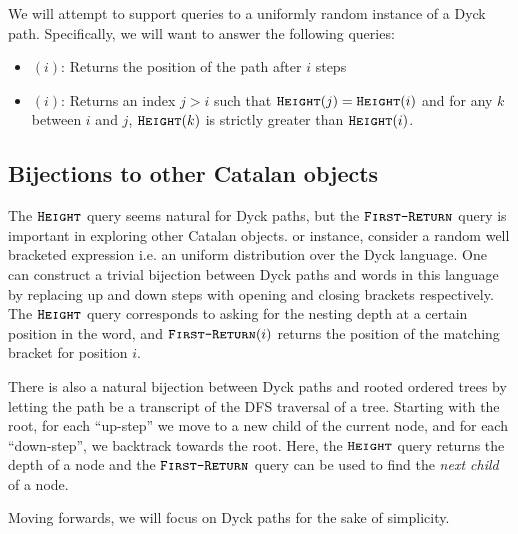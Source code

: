 We will attempt to support queries to a uniformly random instance of a Dyck path.
Specifically, we will want to answer the following queries:
\begin{itemize}
    \item {}$(i)$: Returns the position of the path after $i$ steps
    \item {}$(i)$: Returns an index $j>i$ such that $\texttt{\textsc{Height}}(j)=\texttt{\textsc{Height}}(i)$ and for any $k$ between $i$ and $j$,
    $\texttt{\textsc{Height}}(k)$ is strictly greater than $\texttt{\textsc{Height}}(i)$.
\end{itemize}



\subsection{Bijections to other Catalan objects}%
\label{sec:bijections_to_other_catalan_objects}
The $\texttt{\textsc{Height}}$ query seems natural for Dyck paths, but the $\texttt{\textsc{First-Return}}$ query is important in exploring other Catalan objects.
or instance, consider a random well bracketed expression i.e. an uniform distribution over the Dyck language.
One can construct a trivial bijection between Dyck paths and words in this language
by replacing up and down steps with opening and closing brackets respectively.
The $\texttt{\textsc{Height}}$ query corresponds to asking for the nesting depth at a certain position in the word,
and $\texttt{\textsc{First-Return}}(i)$ returns the position of the matching bracket for position $i$.

There is also a natural bijection between Dyck paths and rooted ordered trees by letting the path be a transcript of the DFS traversal of a tree.
Starting with the root, for each ``up-step'' we move to a new child of the current node, and for each ``down-step'', we backtrack towards the root.
Here, the $\texttt{\textsc{Height}}$ query returns the depth of a node and the $\texttt{\textsc{First-Return}}$ query can be used to find the \emph{next child} of a node.

Moving forwards, we will focus on Dyck paths for the sake of simplicity.



